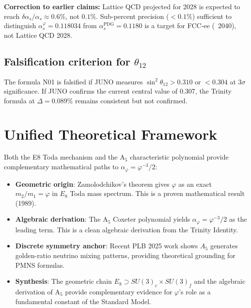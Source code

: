 \documentclass[10pt,a4paper]{article}
\begin{document}
\textbf{Correction to earlier claims:} Lattice QCD projected for 2028 is expected to reach
$\delta\alpha_s/\alpha_s \approx 0.6\%$, not $0.1\%$. Sub-percent precision ($< 0.1\%$)
sufficient to distinguish $\alpha_s^\varphi = 0.118034$ from $\alpha_s^{\text{PDG}} = 0.1180$ is
a target for FCC-ee (~2040), not Lattice QCD 2028.

\subsection*{Falsification criterion for $\theta_{12}$}

The formula N01 is falsified if JUNO measures $\sin^2\theta_{12} > 0.310$ or $< 0.304$
at $3\sigma$ significance. If JUNO confirms the current central value of 0.307, the Trinity
formula at $\Delta = 0.089\%$ remains consistent but not confirmed.

\medskip

\section*{Unified Theoretical Framework}

Both the E8 Toda mechanism and the A$_5$ characteristic polynomial provide complementary
mathematical paths to $\alpha_\varphi = \varphi^{-3}/2$:

\begin{itemize}
  \item \textbf{Geometric origin}: Zamolodchikov's theorem gives $\varphi$ as an exact
        $m_2/m_1 = \varphi$ in $E_8$ Toda mass spectrum.
        This is a proven mathematical result (1989).

  \item \textbf{Algebraic derivation}: The A$_5$ Coxeter polynomial yields
        $\alpha_\varphi = \varphi^{-3}/2$ as the leading term.
        This is a clean algebraic derivation from the Trinity Identity.

  \item \textbf{Discrete symmetry anchor}: Recent PLB 2025 work shows $A_5$ generates
        golden-ratio neutrino mixing patterns, providing theoretical grounding for PMNS formulas.

  \item \textbf{Synthesis}: The geometric chain $E_8 \supset SU(3)_c \times SU(3)_f$ and the
        algebraic derivation of A$_5$ provide complementary evidence for $\varphi$'s role
        as a fundamental constant of the Standard Model.
\end{itemize}
\end{document}
